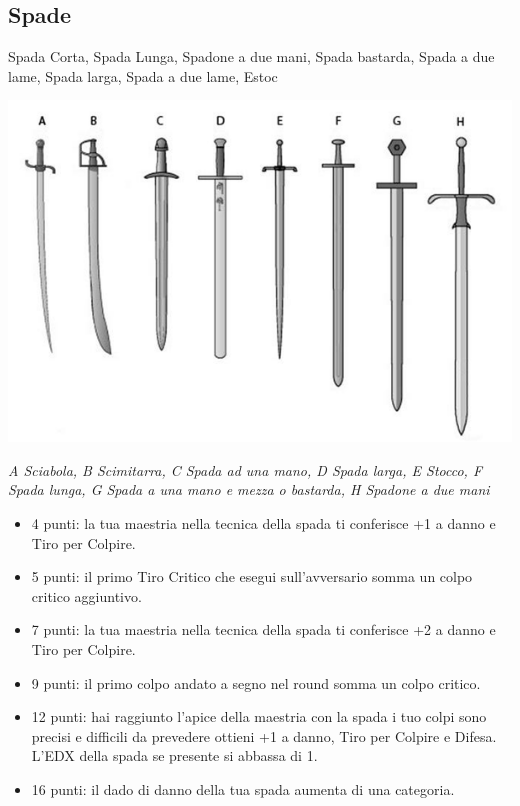 \begin{multicols}{2}
\begin{itemize}[leftmargin=*]
\end{itemize}

\subsection{Spade} Spada Corta, Spada Lunga, Spadone a due mani, Spada bastarda, Spada a due lame, Spada larga, Spada a due lame, Estoc

\begin{center}
	\includegraphics[width=0.8\linewidth]{immagini/arma-tipi-di-spade.png}

	\emph{A Sciabola, B Scimitarra, C Spada ad una mano, D Spada larga, E Stocco, F Spada lunga, G Spada a una mano e mezza o bastarda, H Spadone a due mani}
\end{center}

\medskip

\begin{itemize}[leftmargin=*] \setlength{\itemsep}{0pt}

\item 4 punti: la tua maestria nella tecnica della spada ti conferisce +1 a danno e Tiro per Colpire.
\item 5 punti: il primo Tiro Critico che esegui sull'avversario somma un colpo critico aggiuntivo.
\item 7 punti: la tua maestria nella tecnica della spada ti conferisce +2 a danno e Tiro per Colpire.
\item 9 punti: il primo colpo andato a segno nel round somma un colpo critico.
\item 12 punti: hai raggiunto l'apice della maestria con la spada i tuo colpi sono precisi e difficili da prevedere ottieni +1 a danno, Tiro per Colpire e Difesa. L'EDX della spada se presente si abbassa di 1.
\item 16 punti: il dado di danno della tua spada aumenta di una categoria.


\end{itemize}
\end{multicols}
